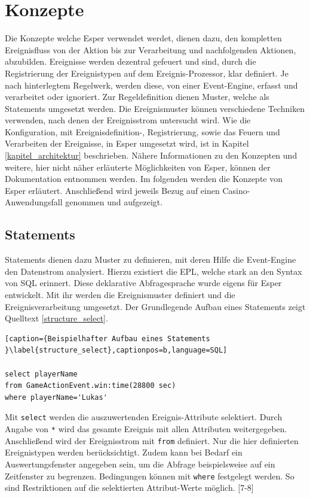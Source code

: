 \chapter{Konzepte}
Die Konzepte welche Esper verwendet werdet, dienen dazu, den kompletten Ereignisfluss von der Aktion bis zur Verarbeitung und nachfolgenden Aktionen, abzubilden.
Ereignisse werden dezentral gefeuert und sind, durch die Registrierung der Ereignistypen auf dem Ereignis-Prozessor, klar definiert. Je nach hinterlegtem Regelwerk, werden diese, von einer Event-Engine, erfasst und verarbeitet oder ignoriert. Zur Regeldefinition dienen Muster, welche als Statements umgesetzt werden. Die Ereignismuster können verschiedene Techniken verwenden, nach denen der Ereignisstrom untersucht wird. 
Wie die Konfiguration, mit Ereignisdefinition-, Registrierung, sowie das Feuern und Verarbeiten der Ereignisse, in Esper umgesetzt wird, ist in Kapitel \ref{kapitel_architektur} beschrieben.
Nähere Informationen zu den Konzepten und weitere, hier nicht näher erläuterte Möglichkeiten von Esper, können der Dokumentation \cite{EsperRef2018} entnommen werden.
Im folgenden werden die Konzepte von Esper erläutert. Anschließend wird jeweils Bezug auf einen Casino-Anwendungsfall genommen und aufgezeigt.


\section{Statements}
\label{statements}
Statements dienen dazu Muster zu definieren, mit deren Hilfe die Event-Engine den Datenstrom analysiert. Hierzu existiert die \acf{EPL}, welche stark an den Syntax von SQL erinnert. Diese deklarative Abfragesprache wurde eigens für Esper entwickelt. Mit ihr werden die Ereignismuster definiert und die Ereignisverarbeitung umgesetzt. Der Grundlegende Aufbau eines Statements zeigt Quelltext \ref{structure_select}.
\begin{lstlisting}[caption={Beispielhafter Aufbau eines Statements }\label{structure_select},captionpos=b,language=SQL]

select playerName 
from GameActionEvent.win:time(28800 sec)
where playerName='Lukas'

\end{lstlisting}
Mit \texttt{select} werden die auszuwertenden Ereignis-Attribute selektiert. Durch Angabe von \texttt{*} wird das gesamte Ereignis mit allen Attributen weitergegeben.
Anschließend wird der Ereignisstrom mit \texttt{from} definiert.
Nur die hier definierten Ereignistypen werden berücksichtigt. Zudem kann bei Bedarf ein Auswertungsfenster angegeben sein, um die Abfrage beispielsweise auf ein Zeitfenster zu begrenzen.
Bedingungen können mit \texttt{where} festgelegt werden. So sind Restriktionen auf die selektierten Attribut-Werte möglich.
\cite{EsperRef2018}[7-8]

